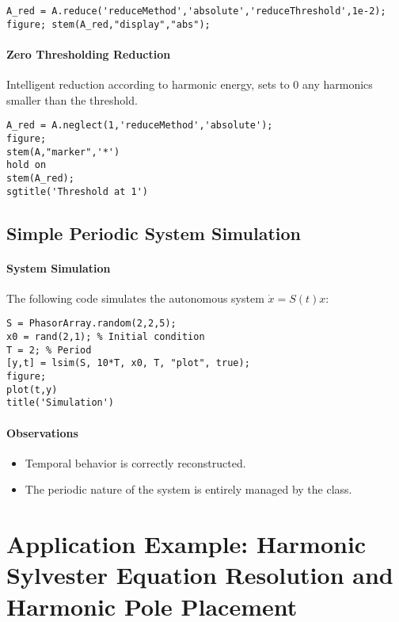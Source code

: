 \documentclass[11pt,a4paper]{article}
\begin{document}
\begin{lstlisting}[style=matlabstyle]
A_red = A.reduce('reduceMethod','absolute','reduceThreshold',1e-2);
figure; stem(A_red,"display","abs");
\end{lstlisting}

\paragraph{Zero Thresholding Reduction}  
Intelligent reduction according to harmonic energy, sets to 0 any harmonics smaller than the threshold.

\begin{lstlisting}[style=matlabstyle]
A_red = A.neglect(1,'reduceMethod','absolute');
figure;
stem(A,"marker",'*')
hold on 
stem(A_red);
sgtitle('Threshold at 1')
\end{lstlisting}

\subsection{Simple Periodic System Simulation}

\paragraph{System Simulation}  
The following code simulates the autonomous system $\dot{x} = S(t) x$:

\begin{lstlisting}[style=matlabstyle]
S = PhasorArray.random(2,2,5);
x0 = rand(2,1); % Initial condition
T = 2; % Period
[y,t] = lsim(S, 10*T, x0, T, "plot", true);
figure;
plot(t,y)
title('Simulation')
\end{lstlisting}

\paragraph{Observations}
\begin{itemize}
    \item Temporal behavior is correctly reconstructed.
    \item The periodic nature of the system is entirely managed by the class.
\end{itemize}

\section{Application Example: Harmonic Sylvester Equation Resolution and Harmonic Pole Placement}
\end{document}
